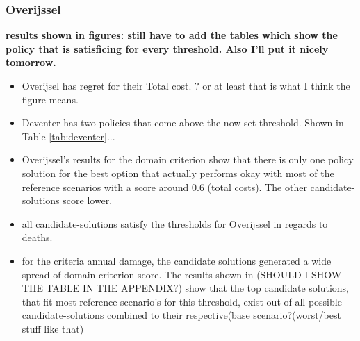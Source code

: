 \subsubsection{Overijssel}
\textbf{results shown in figures: still have to add the tables which show the policy that is satisficing for every threshold. Also I'll put it nicely tomorrow. }
\begin{itemize}
    \item Overijsel has regret for their Total cost. ? or at least that is what I think the figure means.
    \item Deventer has two policies that come above the now set threshold. Shown in Table \ref{tab:deventer}...
    \item Overijssel's results for the domain criterion show that there is only one policy solution for the best option that actually performs okay with most of the reference scenarios with a score around 0.6 (total costs). The other candidate-solutions score lower. 
    \item all candidate-solutions satisfy the thresholds for Overijssel in regards to deaths.
    \item for the criteria annual damage, the candidate solutions generated a wide spread of domain-criterion score. The results shown in (SHOULD I SHOW THE TABLE IN THE APPENDIX?) show that the top candidate solutions, that fit most reference scenario's for this threshold, exist out of all possible candidate-solutions combined to their respective(base scenario?(worst/best stuff like that)
\end{itemize}
